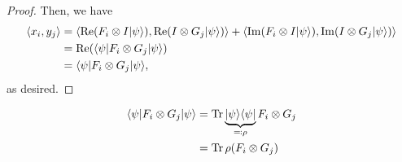 \begin{proof}
	Then, we have
	\begin{align*}
		\sclr{x_i}{y_j} &= \sclr{\Real(F_i\tensor I \dr{\psi})}{\Real(I\tensor G_j \dr{\psi})}+ \sclr{\Imag(F_i\tensor I \dr{\psi})}{\Imag(I\tensor G_j \dr{\psi})}\\
		&= \Real(\dl{\psi} F_i\tensor G_j \dr{\psi}) \\
		&= \dl{\psi} F_i\tensor G_j \dr{\psi},
	\end{align*}
	as desired.
\end{proof}

\begin{align*}
	\dl{\psi} F_i\tensor G_j \dr{\psi} &= \trace{\underbrace{\dr{\psi}\dl{\psi}}_{\eqqcolon\rho}F_i\tensor G_j} \\
	&=\trace{\rho(F_i\tensor G_j)}
\end{align*}
\newpage